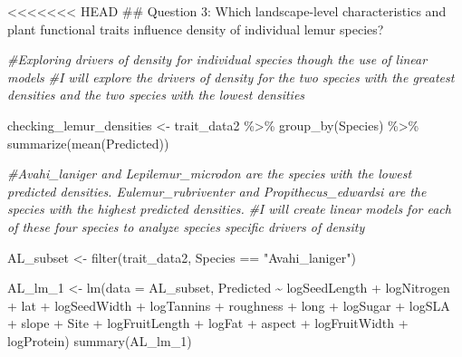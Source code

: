 \documentclass[
  12pt,
]{article}
\newenvironment{Shaded}{\begin{snugshade}}{\end{snugshade}}
\newcommand{\AttributeTok}[1]{\textcolor[rgb]{0.77,0.63,0.00}{#1}}
\newcommand{\CommentTok}[1]{\textcolor[rgb]{0.56,0.35,0.01}{\textit{#1}}}
\newcommand{\FunctionTok}[1]{\textcolor[rgb]{0.00,0.00,0.00}{#1}}
\newcommand{\NormalTok}[1]{#1}
\newcommand{\OtherTok}[1]{\textcolor[rgb]{0.56,0.35,0.01}{#1}}
\newcommand{\SpecialCharTok}[1]{\textcolor[rgb]{0.00,0.00,0.00}{#1}}
\newcommand{\StringTok}[1]{\textcolor[rgb]{0.31,0.60,0.02}{#1}}
\begin{document}
\newpage

\textless\textless\textless\textless\textless\textless\textless{} HEAD
\#\# Question 3: Which landscape-level characteristics and plant
functional traits influence density of individual lemur species?

\begin{Shaded}
\begin{Highlighting}[]
\CommentTok{\#Exploring drivers of density for individual species though the use of linear models}
\CommentTok{\#I will explore the drivers of density for the two species with the greatest densities and the two species with the lowest densities}

\NormalTok{checking\_lemur\_densities }\OtherTok{\textless{}{-}}
\NormalTok{  trait\_data2 }\SpecialCharTok{\%\textgreater{}\%} 
  \FunctionTok{group\_by}\NormalTok{(Species) }\SpecialCharTok{\%\textgreater{}\%} 
  \FunctionTok{summarize}\NormalTok{(}\FunctionTok{mean}\NormalTok{(Predicted))}

\CommentTok{\#Avahi\_laniger and Lepilemur\_microdon are the species with the lowest predicted densities. Eulemur\_rubriventer and Propithecus\_edwardsi are the species with the highest predicted densities. }
\CommentTok{\#I will create linear models for each of these four species to analyze species specific drivers of density}

\NormalTok{AL\_subset }\OtherTok{\textless{}{-}} \FunctionTok{filter}\NormalTok{(trait\_data2, Species }\SpecialCharTok{==} \StringTok{"Avahi\_laniger"}\NormalTok{)}

\NormalTok{AL\_lm\_1 }\OtherTok{\textless{}{-}} \FunctionTok{lm}\NormalTok{(}\AttributeTok{data =}\NormalTok{ AL\_subset, Predicted }\SpecialCharTok{\textasciitilde{}}\NormalTok{ logSeedLength }\SpecialCharTok{+}\NormalTok{ logNitrogen }\SpecialCharTok{+}\NormalTok{ lat }\SpecialCharTok{+}\NormalTok{ logSeedWidth }\SpecialCharTok{+}\NormalTok{ logTannins }\SpecialCharTok{+}\NormalTok{ roughness }\SpecialCharTok{+}\NormalTok{ long }\SpecialCharTok{+}\NormalTok{ logSugar }\SpecialCharTok{+}\NormalTok{ logSLA }\SpecialCharTok{+}\NormalTok{ slope }\SpecialCharTok{+}\NormalTok{ Site }\SpecialCharTok{+}\NormalTok{ logFruitLength }\SpecialCharTok{+}\NormalTok{ logFat }\SpecialCharTok{+}\NormalTok{ aspect }\SpecialCharTok{+}\NormalTok{ logFruitWidth }\SpecialCharTok{+}\NormalTok{ logProtein)}
\FunctionTok{summary}\NormalTok{(AL\_lm\_1)}
\end{Highlighting}
\end{Shaded}
\end{document}
